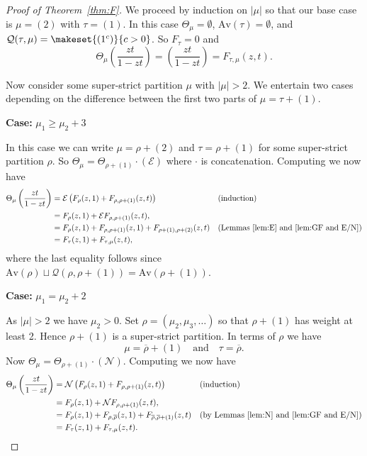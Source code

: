 \documentclass{article}
\theoremstyle{plain}
\theoremstyle{definition}
\newcommand{\Av}{\text{Av}}
\newcommand{\N}{\mathcal{N}}
\newcommand{\E}{\mathcal{E}}
\newcommand{\Q}{\mathcal{Q}}
\renewcommand{\ne}[1]{\overline{#1}}
\begin{document}
\begin{proof}[Proof of Theorem~\ref{thm:F}]
We proceed by induction on $|\mu|$ so that our base case is $\mu = (2)$ with $\tau = (1)$.  In this case $\Theta_\mu = \emptyset$, $\Av(\tau) = \emptyset$, and $\Q(\tau,\mu) = \makeset{(1^c)}{c>0}$.  So $F_\tau = 0$ and 
$$\Theta_\mu\left(\frac{zt}{1-zt}\right) = \left(\frac{zt}{1-zt}\right) = F_{\tau,\mu}(z,t).$$


Now consider some super-strict partition $\mu$ with $|\mu|>2$.  We entertain two cases depending on the difference between the first two parts of $\mu=\tau +(1)$. 

\medskip\noindent
\textbf{Case:} $\mu_1 \geq \mu_2+3$  
\medskip

In this case we can write $\mu = \rho+(2)$ and $\tau = \rho+(1)$ for some super-strict partition $\rho$.  So $\Theta_\mu = \Theta_{\rho+(1)}\cdot (\E)$ where  $\cdot$ is concatenation.  Computing we now have
\begin{align*}
\Theta_\mu\left(\frac{zt}{1-zt}\right) &= \E\left(F_{\rho}(z,1) + F_{\rho,\rho+(1)}(z,t)\right)	&&\textrm{(induction)}\\
&= F_{\rho}(z,1) + \E F_{\rho,\rho+(1)}(z,t),	\\
&=F_{\rho}(z,1) + F_{\rho,\rho+(1)}(z,1) + F_{\rho+(1),\rho+(2)}(z,t) &&\textrm{(Lemmas~\ref{lem:E} and \ref{lem:GF and E/N})}\\
& = F_{\tau}(z,1) + F_{\tau,\mu}(z,t),
\end{align*}
where the last equality follows since $\Av(\rho)\sqcup \Q(\rho,\rho+(1)) = \Av(\rho+(1))$.


\medskip\noindent
\textbf{Case:} $\mu_1 =\mu_2+2$ 
\medskip

As $|\mu|>2$ we have $\mu_2>0$. Set $\rho = (\mu_2,\mu_3,\ldots)$ so that  $\rho+(1)$ has weight at least 2.  Hence $\rho+(1)$ is a super-strict partition.  In terms of $\rho$ we have
$$\mu = \ne\rho +(1)\quad \textrm{and}\quad \tau = \ne\rho.$$ 
Now $\Theta_\mu = \Theta_{\rho+(1)}\cdot (\N)$.   Computing we now have
\begin{align*}
\Theta_\mu\left(\frac{zt}{1-zt}\right) &= \N\left(F_{\rho}(z,1) + F_{\rho,\rho+(1)}(z,t)\right)	&&\textrm{(induction)}\\
&= F_{\rho}(z,1) + \N F_{\rho,\rho+(1)}(z,t),	\\
&=F_{\rho}(z,1) + F_{\rho,\ne\rho}(z,1) + F_{\ne\rho,\ne\rho+(1)}(z,t) &&\textrm{(by Lemmas~\ref{lem:N} and \ref{lem:GF and E/N})}\\
& = F_{\tau}(z,1) + F_{\tau,\mu}(z,t). &&  \qedhere \end{align*}  

\end{proof}
\end{document}
